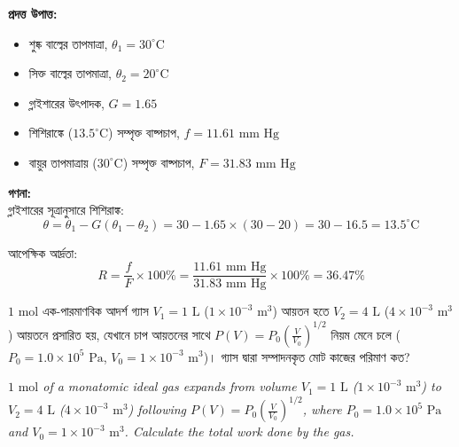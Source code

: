 \documentclass[12pt, a4paper]{article}
\begin{document}
\begin{tcolorbox}[solutionbox={সমাধান (Solution)}]
    \noindent
    \textbf{প্রদত্ত উপাত্ত:}
    \begin{itemize}[leftmargin=1.5em, itemsep=0.2em]
        \item শুষ্ক বাল্বের তাপমাত্রা, $\theta_1 = 30^\circ\text{C}$
        \item সিক্ত বাল্বের তাপমাত্রা, $\theta_2 = 20^\circ\text{C}$
        \item গ্লাইশারের উৎপাদক, $G = 1.65$
        \item শিশিরাঙ্কে ($13.5^\circ\text{C}$) সম্পৃক্ত বাষ্পচাপ, $f = 11.61\text{ mm Hg}$
        \item বায়ুর তাপমাত্রায় ($30^\circ\text{C}$) সম্পৃক্ত বাষ্পচাপ, $F = 31.83\text{ mm Hg}$
    \end{itemize}

    \vspace{0.6em}
    \noindent\textbf{গণনা:} \\
    গ্লাইশারের সূত্রানুসারে শিশিরাঙ্ক:
    \[ \theta = \theta_1 - G(\theta_1 - \theta_2) = 30 - 1.65 \times (30 - 20) = 30 - 16.5 = 13.5^\circ\text{C} \]
    
    আপেক্ষিক আর্দ্রতা:
    \[ R = \frac{f}{F} \times 100\% = \frac{11.61\text{ mm Hg}}{31.83\text{ mm Hg}} \times 100\% = \mathbf{36.47\%} \]
\end{tcolorbox}

\begin{tcolorbox}[questionbox={প্রশ্ন (Question) 12}]
    \noindent
    $1\text{ mol}$ এক-পারমাণবিক আদর্শ গ্যাস $V_1 = 1\text{ L}$ ($1 \times 10^{-3}\text{ m}^3$) আয়তন হতে $V_2 = 4\text{ L}$ ($4 \times 10^{-3}\text{ m}^3$) আয়তনে প্রসারিত হয়, যেখানে চাপ আয়তনের সাথে $P(V) = P_0 \left(\frac{V}{V_0}\right)^{1/2}$ নিয়ম মেনে চলে ($P_0 = 1.0 \times 10^5\text{ Pa}$, $V_0 = 1 \times 10^{-3}\text{ m}^3$)। গ্যাস দ্বারা সম্পাদনকৃত মোট কাজের পরিমাণ কত?
    
    \vspace{0.8em}
    \begin{english}
    \noindent\textit{\color{darkgray}
    $1\text{ mol}$ of a monatomic ideal gas expands from volume $V_1 = 1\text{ L}$ ($1 \times 10^{-3}\text{ m}^3$) to $V_2 = 4\text{ L}$ ($4 \times 10^{-3}\text{ m}^3$) following $P(V) = P_0 \left(\frac{V}{V_0}\right)^{1/2}$, where $P_0 = 1.0 \times 10^5\text{ Pa}$ and $V_0 = 1 \times 10^{-3}\text{ m}^3$. Calculate the total work done by the gas.
    }
    \end{english}
\end{tcolorbox}
\end{document}
